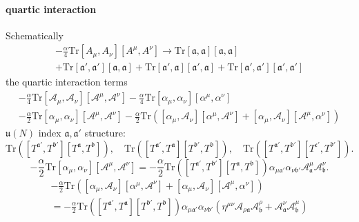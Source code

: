 
\paragraph{quartic interaction}
Schematically
\begin{align*}
	-\frac{\alpha}{4} \mathrm{Tr} [A_\mu,A_\nu][A^\mu,A^\nu]
	\to \mathrm{Tr}[\mathfrak{a},\mathfrak{a}][\mathfrak{a},\mathfrak{a}] \\
	+ \mathrm{Tr}[\mathfrak{a}',\mathfrak{a}'][\mathfrak{a},\mathfrak{a}]
	+ \mathrm{Tr}[\mathfrak{a}',\mathfrak{a}][\mathfrak{a}',\mathfrak{a}]
	+\mathrm{Tr} [\mathfrak{a}',\mathfrak{a}']
	[\mathfrak{a}',\mathfrak{a}']
\end{align*}
the quartic interaction terms
\begin{align*}
	-\frac{\alpha}{4} \mathrm{Tr} 
	[\mathcal{A}_\mu,\mathcal{A}_\nu][\mathcal{A}^\mu,\mathcal{A}^\nu]
	-\frac{\alpha}{4} \mathrm{Tr} 
	[\alpha_\mu,\alpha_\nu][\alpha^\mu,\alpha^\nu] \\
 - \frac{\alpha}{2} \mathrm{Tr}
 [\alpha_\mu,\alpha_\nu][\mathcal{A}^\mu,\mathcal{A}^\nu]
 - \frac{\alpha}{2} \mathrm{Tr}
 \left( [\alpha_\mu,\mathcal{A}_\nu][\alpha^\mu,\mathcal{A}^\nu]
 + [\alpha_\mu,\mathcal{A}_\nu][\mathcal{A}^\mu,\alpha^\nu]\right) 
\end{align*}
$\mathfrak{u}(N)$ index $\mathfrak{a},\mathfrak{a}'$ structure:
\[
	\mathrm{Tr}([T^{\mathfrak{a}'},T^{\mathfrak{b}'}]
	[T^{\mathfrak{a}},T^{\mathfrak{b}}]),\quad
	\mathrm{Tr}([T^{\mathfrak{a}'},T^{\mathfrak{a}}]
	[T^{\mathfrak{b}'},T^{\mathfrak{b}}]),\quad
	\mathrm{Tr}([T^{\mathfrak{a}'},T^{\mathfrak{b}'}]
	[T^{\mathfrak{c}'},T^{\mathfrak{d}'}])
.\] 
\[
 - \frac{\alpha}{2} \mathrm{Tr}
 [\alpha_\mu,\alpha_\nu][\mathcal{A}^\mu,\mathcal{A}^\nu]
 =-\frac{\alpha}{2}	\mathrm{Tr}([T^{\mathfrak{a}'},T^{\mathfrak{b}'}]
	[T^{\mathfrak{a}},T^{\mathfrak{b}}])
	\alpha_{\mu \mathfrak{a}'} \alpha_{\nu \mathfrak{b}'}
	\mathcal{A}^\mu_{\mathfrak{a}} \mathcal{A}^\nu_{\mathfrak{b}}
.\] 
\begin{align*}
 - \frac{\alpha}{2} \mathrm{Tr}
\left( [\alpha_\mu,\mathcal{A}_\nu][\alpha^\mu,\mathcal{A}^\nu]
+ [\alpha_\mu,\mathcal{A}_\nu][\mathcal{A}^\mu,\alpha^\nu]\right) \\
= -\frac{\alpha}{2} 	\mathrm{Tr}([T^{\mathfrak{a}'},T^{\mathfrak{a}}]
	[T^{\mathfrak{b}'},T^{\mathfrak{b}}])
	\alpha_{\mu \mathfrak{a}'} \alpha_{\nu \mathfrak{b}'}
	(\eta^{\mu\nu} \mathcal{A}_{\rho \mathfrak{a}} \mathcal{A}^\rho_{\mathfrak{b}}
	+ \mathcal{A}^\nu_{\mathfrak{a}} \mathcal{A}^\mu_{\mathfrak{b}})
\end{align*}
